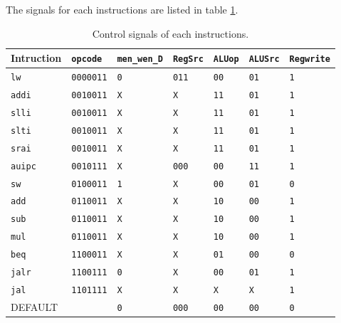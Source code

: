 \documentclass[12pt]{article}
\begin{document}
The signals for each instructions are listed in table \ref{tab:control}.

\begin{table}[h]
\centering
\begin{tabular}{@{}lllllll@{}}
\toprule
Intruction     & \texttt{opcode}           & \texttt{men\_wen\_D}  & \texttt{RegSrc}       & \texttt{ALUop}       & \texttt{ALUSrc}      & \texttt{Regwrite}   \\ \midrule
\texttt{lw}    & \texttt{0000011} & \texttt{0} & \texttt{011} & \texttt{00} & \texttt{01} & \texttt{1} \\
\texttt{addi}  & \texttt{0010011} & \texttt{X} & \texttt{X}   & \texttt{11} & \texttt{01} & \texttt{1} \\
\texttt{slli}  & \texttt{0010011} & \texttt{X} & \texttt{X}   & \texttt{11} & \texttt{01} & \texttt{1} \\
\texttt{slti}  & \texttt{0010011} & \texttt{X} & \texttt{X}   & \texttt{11} & \texttt{01} & \texttt{1} \\
\texttt{srai}  & \texttt{0010011} & \texttt{X} & \texttt{X}   & \texttt{11} & \texttt{01} & \texttt{1} \\
\texttt{auipc} & \texttt{0010111} & \texttt{X} & \texttt{000} & \texttt{00} & \texttt{11} & \texttt{1} \\
\texttt{sw}    & \texttt{0100011} & \texttt{1} & \texttt{X}   & \texttt{00} & \texttt{01} & \texttt{0} \\
\texttt{add}   & \texttt{0110011} & \texttt{X} & \texttt{X}   & \texttt{10} & \texttt{00} & \texttt{1} \\
\texttt{sub}   & \texttt{0110011} & \texttt{X} & \texttt{X}   & \texttt{10} & \texttt{00} & \texttt{1} \\
\texttt{mul}   & \texttt{0110011} & \texttt{X} & \texttt{X}   & \texttt{10} & \texttt{00} & \texttt{1} \\
\texttt{beq}   & \texttt{1100011} & \texttt{X} & \texttt{X}   & \texttt{01} & \texttt{00} & \texttt{0} \\
\texttt{jalr}  & \texttt{1100111} & \texttt{0} & \texttt{X}   & \texttt{00} & \texttt{01} & \texttt{1} \\
\texttt{jal}   & \texttt{1101111} & \texttt{X} & \texttt{X}   & \texttt{X}  & \texttt{X}  & \texttt{1} \\
DEFAULT        &                  & \texttt{0} & \texttt{000} & \texttt{00} & \texttt{00} & \texttt{0} \\ \bottomrule
\end{tabular}
\caption{Control signals of each instructions.}
\label{tab:control}
\end{table} 
\end{document}

